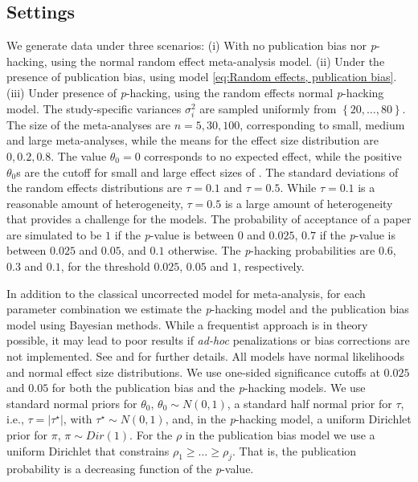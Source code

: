 \documentclass[useAMS,usenatbib,referee]{biom}
\begin{document}
\subsection{Settings}
We generate data under three scenarios: (i) With no publication bias nor \textit{p}-hacking, using the normal random effect meta-analysis model. (ii) Under the presence of publication bias, using model \eqref{eq:Random effects, publication bias}. (iii) Under presence of \textit{p}-hacking, using the random effects normal \textit{p}-hacking model. The study-specific variances $\sigma_{i}^{2}$ are sampled uniformly from $\left\{ 20,\ldots,80\right\} $. The size of the meta-analyses are $n = 5, 30, 100$, corresponding to small, medium and large meta-analyses, while the means for the effect size distribution are $0, 0.2, 0.8$. The value $\theta_0 = 0$ corresponds to no expected effect, while the positive $\theta_0$s are the cutoff for small and large effect sizes of \citet[][pages 24 -- 27]{cohen1988statistical}. The standard deviations of the random effects distributions are $\tau=0.1$ and $\tau=0.5$. While $\tau = 0.1$ is a reasonable amount of heterogeneity, $\tau=0.5$ is a large amount of heterogeneity that provides a challenge for the models. The probability of acceptance of a paper are simulated to be $1$ if the \textit{p}-value is between $0$ and $0.025$, $0.7$ if the \textit{p}-value is between $0.025$ and $0.05$, and $0.1$ otherwise. The \textit{p}-hacking probabilities are $0.6$, $0.3$ and $0.1$, for the threshold $0.025$, $0.05$ and $1$, respectively. 

In addition to the classical uncorrected model for meta-analysis, for each parameter combination we estimate the \textit{p}-hacking model and the publication bias model using Bayesian methods. While a frequentist approach is in theory possible, it may lead to poor results if {\it ad-hoc} penalizations or bias corrections are not implemented. See  \citet[Appendix, 1]{mcshane2016adjusting} and \citet{Moss2019} for further details. All models have normal likelihoods and normal effect size distributions. We use one-sided significance cutoffs at $0.025$ and $0.05$ for both the publication bias and the \textit{p}-hacking models. We use standard normal priors for $\theta_0$, $\theta_0 \sim N(0, 1)$, a standard half normal prior for $\tau$, i.e., $\tau = |\tau^\star|$, with $\tau^\star \sim N(0, 1)$, and, in the \textit{p}-hacking model, a uniform Dirichlet prior for $\pi$, $\pi \sim Dir(1)$. For the $\rho$ in the publication bias model we use a uniform Dirichlet that constrains $\rho_{1}\geq\ldots\geq\rho_{j}$. That is, the publication probability is a decreasing function of the \textit{p}-value.
\end{document}
